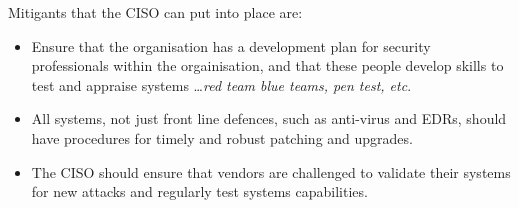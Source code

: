 Mitigants that the CISO can put into place are:
\begin{itemize}
\item Ensure that the organisation has a development plan for security professionals within the orgainisation, and that these people develop skills to test and appraise systems \ldots \textit{red team blue teams, pen test, etc}.
\item  All systems, not just front line defences, such as anti-virus and EDRs, should have procedures for timely and robust patching and upgrades.
\item The CISO should ensure that vendors are challenged to  validate their systems for new attacks and regularly test systems capabilities. 
\end{itemize}